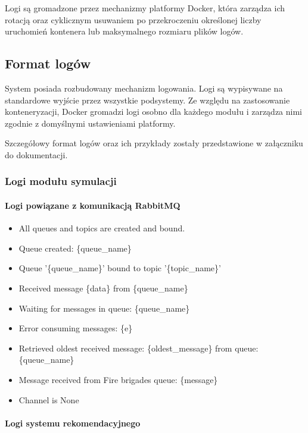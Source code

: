 Logi są gromadzone przez mechanizmy platformy Docker, która zarządza ich rotacją oraz cyklicznym usuwaniem po przekroczeniu określonej liczby uruchomień kontenera lub maksymalnego rozmiaru plików logów.

\subsection{Format logów}

System posiada rozbudowany mechanizm logowania. Logi są wypisywane na standardowe wyjście przez wszystkie podsystemy. Ze względu na zastosowanie konteneryzacji, Docker gromadzi logi osobno dla każdego modułu i zarządza nimi zgodnie z domyślnymi ustawieniami platformy.

Szczegółowy format logów oraz ich przykłady zostały przedstawione w załączniku do dokumentacji.

\subsubsection{Logi modułu symulacji}

\paragraph{Logi powiązane z komunikacją RabbitMQ}

\begin{itemize}
    \item All queues and topics are created and bound.
    \item Queue created: \{queue\_name\}
    \item Queue '\{queue\_name\}' bound to topic '\{topic\_name\}'
    \item Received message \{data\} from \{queue\_name\}
    \item Waiting for messages in queue: \{queue\_name\}
    \item Error consuming messages: \{e\}
    \item Retrieved oldest received message: \{oldest\_message\} from queue: \{queue\_name\}
    \item Message received from Fire brigades queue: \{message\}
    \item Channel is None
\end{itemize}

\paragraph{Logi systemu rekomendacyjnego}

